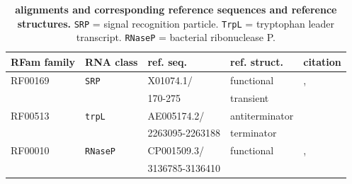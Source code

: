\documentclass[ twoside,openright,titlepage,numbers=noenddot,headinclude,%
                footinclude=false, cleardoublepage=empty,abstractoff, %
                BCOR=5mm,paper=a4,fontsize=11pt,%
                ngerman,american,%
                ]{scrreprt}
\begin{document}
\begin{table}[ht]
\begin{tabular}{l|l|l|l|l}  
{RFam family} & {RNA class} & {ref. seq.} & {ref. struct.} & citation\\  
\hline
RF00169 & \texttt{SRP} & X01074.1/ & functional & \cite{sourceRefSRP1}, \cite{sourceRefSRP2}\\ 
 & & 170-275 & transient & \\ 
 \hline
RF00513 & \texttt{trpL} & AE005174.2/ & antiterminator& \cite{sourceRefTRP} \\
 & & 2263095-2263188 & terminator &  \\
 \hline
RF00010 & \texttt{RNaseP} & CP001509.3/ & functional & \cite{sourceRefRNAseP1}, \cite{sourceRefRNAseP2}\\
 & & 3136785-3136410 & & \\
 \end{tabular} 
\caption{{\bf alignments and corresponding reference sequences and reference structures.} \texttt{SRP} = signal recognition particle. \texttt{TrpL} = tryptophan leader transcript. \texttt{RNaseP} = bacterial ribonuclease P. }
\label{table:alignment description}
\end{table}
\end{document}
